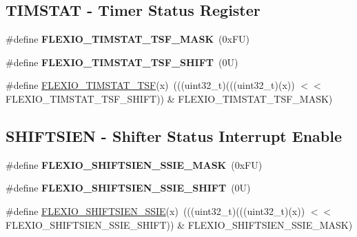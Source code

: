 \subsection*{T\+I\+M\+S\+T\+AT -\/ Timer Status Register}
\begin{DoxyCompactItemize}
\item 
\mbox{\label{group___f_l_e_x_i_o___register___masks_ga1a158c3a3d60c75335453ef684ccc0d5}} 
\#define {\bfseries F\+L\+E\+X\+I\+O\+\_\+\+T\+I\+M\+S\+T\+A\+T\+\_\+\+T\+S\+F\+\_\+\+M\+A\+SK}~(0x\+F\+U)
\item 
\mbox{\label{group___f_l_e_x_i_o___register___masks_ga349a7e6d8288c312951df128891cab84}} 
\#define {\bfseries F\+L\+E\+X\+I\+O\+\_\+\+T\+I\+M\+S\+T\+A\+T\+\_\+\+T\+S\+F\+\_\+\+S\+H\+I\+FT}~(0\+U)
\item 
\#define \mbox{\hyperlink{group___f_l_e_x_i_o___register___masks_ga2ff5585574edd144c0e7558f000f0d72}{F\+L\+E\+X\+I\+O\+\_\+\+T\+I\+M\+S\+T\+A\+T\+\_\+\+T\+SF}}(x)~(((uint32\+\_\+t)(((uint32\+\_\+t)(x)) $<$$<$ F\+L\+E\+X\+I\+O\+\_\+\+T\+I\+M\+S\+T\+A\+T\+\_\+\+T\+S\+F\+\_\+\+S\+H\+I\+FT)) \& F\+L\+E\+X\+I\+O\+\_\+\+T\+I\+M\+S\+T\+A\+T\+\_\+\+T\+S\+F\+\_\+\+M\+A\+SK)
\end{DoxyCompactItemize}
\subsection*{S\+H\+I\+F\+T\+S\+I\+EN -\/ Shifter Status Interrupt Enable}
\begin{DoxyCompactItemize}
\item 
\mbox{\label{group___f_l_e_x_i_o___register___masks_ga4dc7056d01b6b0cfaaf52a2e3ccf33c7}} 
\#define {\bfseries F\+L\+E\+X\+I\+O\+\_\+\+S\+H\+I\+F\+T\+S\+I\+E\+N\+\_\+\+S\+S\+I\+E\+\_\+\+M\+A\+SK}~(0x\+F\+U)
\item 
\mbox{\label{group___f_l_e_x_i_o___register___masks_ga4525cfef7274bc7af701b831427f9179}} 
\#define {\bfseries F\+L\+E\+X\+I\+O\+\_\+\+S\+H\+I\+F\+T\+S\+I\+E\+N\+\_\+\+S\+S\+I\+E\+\_\+\+S\+H\+I\+FT}~(0\+U)
\item 
\#define \mbox{\hyperlink{group___f_l_e_x_i_o___register___masks_ga6d9854ddfbc641ef38dcf39270d3b3b7}{F\+L\+E\+X\+I\+O\+\_\+\+S\+H\+I\+F\+T\+S\+I\+E\+N\+\_\+\+S\+S\+IE}}(x)~(((uint32\+\_\+t)(((uint32\+\_\+t)(x)) $<$$<$ F\+L\+E\+X\+I\+O\+\_\+\+S\+H\+I\+F\+T\+S\+I\+E\+N\+\_\+\+S\+S\+I\+E\+\_\+\+S\+H\+I\+FT)) \& F\+L\+E\+X\+I\+O\+\_\+\+S\+H\+I\+F\+T\+S\+I\+E\+N\+\_\+\+S\+S\+I\+E\+\_\+\+M\+A\+SK)
\end{DoxyCompactItemize}
